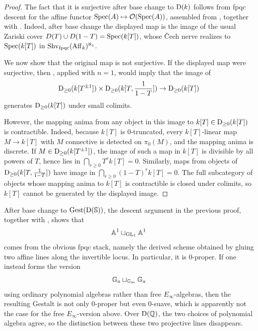 \documentclass[11pt]{book}
\begin{document}
	\begin{proof}
		The fact that it is surjective after base change to $\operatorname{\mathrm{D}}(k)$ follows from fpqc descent for the affine functor $\operatorname{Spec}(A) \mapsto \mathcal{O}(\operatorname{Spec}(A))$, assembled from , together with . Indeed, after base change the displayed map is the image of the usual Zariski cover $D(T) \cup D(1-T) = \operatorname{Spec}(k[T])$, whose \v{C}ech nerve realizes to $\operatorname{Spec}(k[T])$ in $\operatorname{Shv}_{\operatorname{fpqc}}(\operatorname{Aff}_k)^{\aleph_1}$.

		We now show that the original map is not surjective. If the displayed map were surjective, then , applied with $n=1$, would imply that the image of
		\[
			\operatorname{\mathrm{D}}_{\geq 0}(k[T^{\pm 1}]) \times \operatorname{\mathrm{D}}_{\geq 0}(k[T,\frac{1}{1-T}]) \to \operatorname{\mathrm{D}}_{\geq 0}(k[T])
		\]
		generates $\operatorname{\mathrm{D}}_{\geq 0}(k[T])$ under small colimits.

		However, the mapping anima from any object in this image to $k[T] \in \operatorname{\mathrm{D}}_{\geq 0}(k[T])$ is contractible. Indeed, because $k[T]$ is $0$-truncated, every $k[T]$-linear map $M \to k[T]$ with $M$ connective is detected on $\pi_0(M)$, and the mapping anima is discrete. If $M \in \operatorname{\mathrm{D}}_{\geq 0}(k[T^{\pm 1}])$, the image of such a map in $k[T]$ is divisible by all powers of $T$, hence lies in $\bigcap_{r \geq 0} T^r k[T] = 0$. Similarly, maps from objects of $\operatorname{\mathrm{D}}_{\geq 0}(k[T,\frac{1}{1-T}])$ have image in $\bigcap_{r \geq 0} (1-T)^r k[T] = 0$. The full subcategory of objects whose mapping anima to $k[T]$ is contractible is closed under colimits, so $k[T]$ cannot be generated by the displayed image.
	\end{proof}

	\begin{remark}
		After base change to ${\textup{Gest}}(\operatorname{\mathrm{D}}(\operatorname{\mathbb S}))$, the descent argument in the previous proof, together with , shows that
		\[
			\mathbb{A}^1 \sqcup_{\operatorname{GL}_1} \mathbb{A}^1
		\]
		comes from the obvious fpqc stack, namely the derived scheme obtained by gluing two affine lines along the invertible locus. In particular, it is $0$-proper. If one instead forms the version
		\[
			\mathbb{G}_a \sqcup_{\mathbb{G}_m} \mathbb{G}_a
		\]
		using ordinary polynomial algebras rather than free $E_{\infty}$-algebras, then the resulting Gestalt is not only $0$-proper but even $0$-suave, which is apparently not the case for the free $E_{\infty}$-version above. Over $\operatorname{\mathrm{D}}(\operatorname{\mathbb Q})$, the two choices of polynomial algebra agree, so the distinction between these two projective lines disappears.
	\end{remark}
\end{document}
